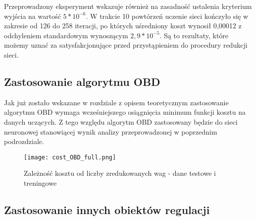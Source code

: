 \par Przeprowadzony eksperyment wskazuje również na zasadność ustalenia kryterium wyjścia na wartość \( 5*10^{-6} \). W trakcie 10 powtórzeń uczenie sieci kończyło się w zakresie od 126 do 258 iteracji, po których uśredniony koszt wynosił 0,00012 z odchyleniem standardowym wynoszącym \( 2,9*10^{-5} \). Są to rezultaty, które możemy uznać za satysfakcjonujące przed przystąpieniem do procedury redukcji sieci.

\subsection{Zastosowanie algorytmu OBD}

Jak już zostało wskazane w rozdziale z opisem teoretycznym zastosowanie algorytmu OBD wymaga wcześniejszego osiągnięcia minimum funkcji kosztu na danych uczących. Z tego względu algorytm OBD zastosowany będzie do sieci neuronowej stanowiącej wynik analizy przeprowadzonej w poprzednim podrozdziale.

\begin{figure}[h]
  \label{fig:Koszt-OBD-full}
  \centering \texttt{[image: cost\_OBD\_full.png]}
  \caption{Zależność kosztu od liczby zredukowanych wag - dane testowe i treningowe}
\end{figure}

\subsection{Zastosowanie innych obiektów regulacji}
